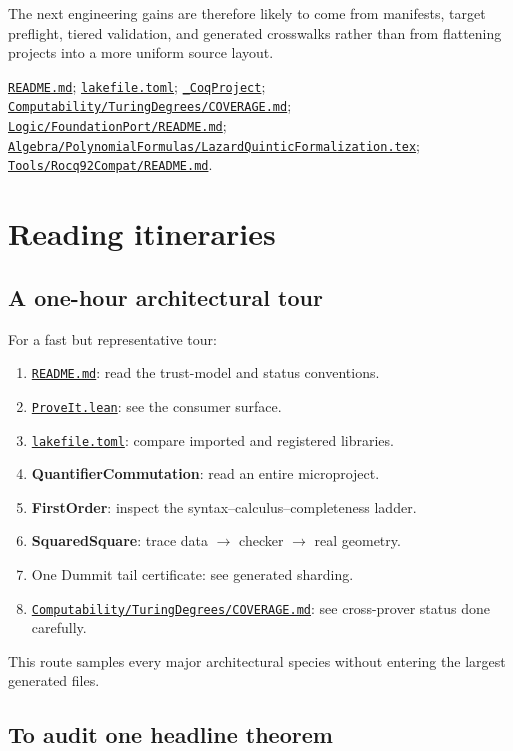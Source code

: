 \documentclass[
  10pt,
  a4paper,
  twoside,
  open=any,
  parskip=half,
  headings=big
]{scrreprt}
\newcommand{\CommitFull}{675d0a2ff0fc624fba199e006049016ba806f40a}
\newcommand{\RepoBlobBase}{https://github.com/VladimirReshetnikov/ProveIt/blob/\CommitFull/}
\newcommand{\RepoFile}[1]{%
  \href{\RepoBlobBase\detokenize{#1}}{\nolinkurl{#1}}}
\newcommand{\project}[1]{\textsf{\bfseries #1}}
\begin{document}
The next engineering gains are therefore likely to come from manifests,
target preflight, tiered validation, and generated crosswalks rather than from
flattening projects into a more uniform source layout.

\begin{sourcebox}
\RepoFile{README.md};
\RepoFile{lakefile.toml};
\RepoFile{_CoqProject};
\RepoFile{Computability/TuringDegrees/COVERAGE.md};
\RepoFile{Logic/FoundationPort/README.md};
\RepoFile{Algebra/PolynomialFormulas/LazardQuinticFormalization.tex};
\RepoFile{Tools/Rocq92Compat/README.md}.
\end{sourcebox}

\chapter{Reading itineraries}
\label{chap:itineraries}

\section{A one-hour architectural tour}

For a fast but representative tour:

\begin{enumerate}
  \item \RepoFile{README.md}: read the trust-model and status conventions.
  \item \RepoFile{ProveIt.lean}: see the consumer surface.
  \item \RepoFile{lakefile.toml}: compare imported and registered libraries.
  \item \project{QuantifierCommutation}: read an entire microproject.
  \item \project{FirstOrder}: inspect the syntax--calculus--completeness ladder.
  \item \project{SquaredSquare}: trace data $\to$ checker $\to$ real geometry.
  \item One Dummit tail certificate: see generated sharding.
  \item \RepoFile{Computability/TuringDegrees/COVERAGE.md}: see cross-prover
        status done carefully.
\end{enumerate}

This route samples every major architectural species without entering the
largest generated files.

\section{To audit one headline theorem}
\end{document}
